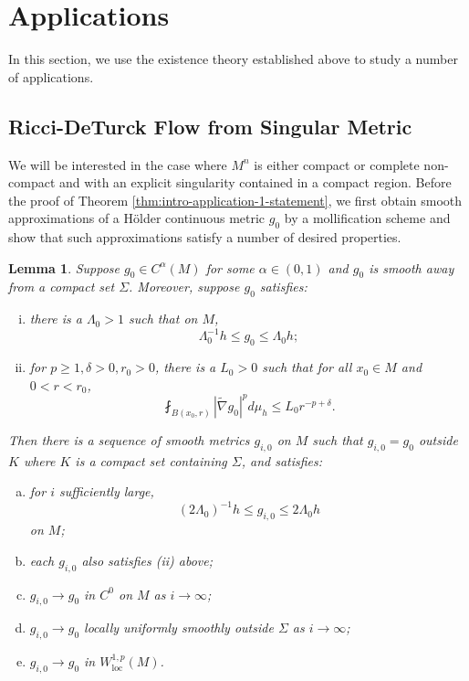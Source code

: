 \documentclass[12pt]{amsart}
\theoremstyle{plain}
\theoremstyle{plain}
\newtheorem{lemma}[subsection]{Lemma}
\theoremstyle{definition}
\theoremstyle{remark}
\numberwithin{equation}{subsection}
\newcommand{\hdel}{\tilde{\nabla}}
\begin{document}
\section{Applications}\label{sec:applications}

In this section, we use the existence theory established above to study a number of applications.

\subsection{Ricci-DeTurck Flow from Singular Metric}

We will be interested in the case where $M^n$ is either compact or complete non-compact and with an explicit singularity contained in a compact region. Before the proof of Theorem \ref{thm:intro-application-1-statement}, we first obtain smooth approximations of a H\"older continuous metric $g_0$ by a mollification scheme and show that such approximations satisfy a number of desired properties.

\begin{lemma}\label{lem:mollification-scheme}
    Suppose $g_0 \in C^\alpha(M)$ for some $\alpha \in (0,1)$ and $g_0$ is smooth away from a compact set $\Sigma$. Moreover, suppose $g_0$ satisfies:
    \begin{enumerate}[(i)]
        \item there is a $\Lambda_0 > 1$ such that on $M$,
        \begin{equation*}
            \Lambda_0^{-1}h \leq g_0 \leq \Lambda_0 h;
        \end{equation*}
        \item for $p \geq 1, \delta > 0, r_0 > 0$, there is a $L_0 > 0$ such that for all $x_0 \in M$ and $0 < r < r_0$,
        \begin{equation*}
            \fint_{B(x_0,r)} |\hdel g_0|^p d\mu_h \leq L_0 r^{-p+\delta}.
        \end{equation*}
    \end{enumerate}
    Then there is a sequence of smooth metrics $g_{i,0}$ on $M$ such that $g_{i,0} = g_0$ outside $K$ where $K$ is a compact set containing $\Sigma$, and satisfies:
    \begin{enumerate}[(a)]
        \item for $i$ sufficiently large,
        \begin{equation*}
            (2\Lambda_0)^{-1}h \leq g_{i,0} \leq 2\Lambda_0 h
        \end{equation*}
        on $M$;
        \item each $g_{i,0}$ also satisfies (ii) above;
        \item $g_{i,0} \to g_0$ in $C^0$ on $M$ as $i \to \infty$;
        \item $g_{i,0} \to g_0$ locally uniformly smoothly outside $\Sigma$ as $i\to\infty$;
        \item $g_{i,0} \to g_0$ in $W^{1,p}_\text{loc}(M)$.
    \end{enumerate}
\end{lemma}
\end{document}
